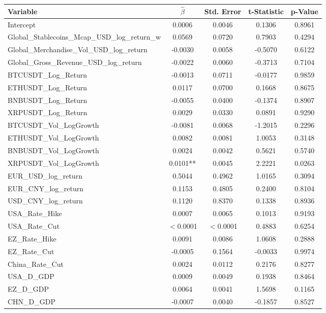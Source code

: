 \begin{tabular}{lcccc}
  \toprule
  \textbf{Variable} & \textbf{$\hat{\beta}$} & \textbf{Std. Error} & \textbf{t-Statistic} & \textbf{p-Value} \\ 
  \midrule
  Intercept & 0.0006 & 0.0046 & 0.1306 & 0.8961 \\ 
  Global\_Stablecoins\_Mcap\_USD\_log\_return\_w & 0.0569 & 0.0720 & 0.7903 & 0.4294 \\ 
  Global\_Merchandise\_Vol\_USD\_log\_return & -0.0030 & 0.0058 & -0.5070 & 0.6122 \\ 
  Global\_Gross\_Revenue\_USD\_log\_return & -0.0022 & 0.0060 & -0.3713 & 0.7104 \\ 
  BTCUSDT\_Log\_Return & -0.0013 & 0.0711 & -0.0177 & 0.9859 \\ 
  ETHUSDT\_Log\_Return & 0.0117 & 0.0700 & 0.1668 & 0.8675 \\ 
  BNBUSDT\_Log\_Return & -0.0055 & 0.0400 & -0.1374 & 0.8907 \\ 
  XRPUSDT\_Log\_Return & 0.0029 & 0.0330 & 0.0891 & 0.9290 \\ 
  BTCUSDT\_Vol\_LogGrowth & -0.0081 & 0.0068 & -1.2015 & 0.2296 \\ 
  ETHUSDT\_Vol\_LogGrowth & 0.0082 & 0.0081 & 1.0053 & 0.3148 \\ 
  BNBUSDT\_Vol\_LogGrowth & 0.0024 & 0.0042 & 0.5621 & 0.5740 \\ 
  XRPUSDT\_Vol\_LogGrowth & 0.0101** & 0.0045 & 2.2221 & 0.0263 \\ 
  EUR\_USD\_log\_return & 0.5044 & 0.4962 & 1.0165 & 0.3094 \\ 
  EUR\_CNY\_log\_return & 0.1153 & 0.4805 & 0.2400 & 0.8104 \\ 
  USD\_CNY\_log\_return & 0.1120 & 0.8370 & 0.1338 & 0.8936 \\ 
  USA\_Rate\_Hike & 0.0007 & 0.0065 & 0.1013 & 0.9193 \\ 
  USA\_Rate\_Cut & $<$0.0001 & $<$0.0001 & 0.4883 & 0.6254 \\ 
  EZ\_Rate\_Hike & 0.0091 & 0.0086 & 1.0608 & 0.2888 \\ 
  EZ\_Rate\_Cut & -0.0005 & 0.1564 & -0.0033 & 0.9974 \\ 
  China\_Rate\_Cut & 0.0024 & 0.0112 & 0.2176 & 0.8277 \\ 
  USA\_D\_GDP & 0.0009 & 0.0049 & 0.1938 & 0.8464 \\ 
  EZ\_D\_GDP & 0.0064 & 0.0041 & 1.5698 & 0.1165 \\ 
  CHN\_D\_GDP & -0.0007 & 0.0040 & -0.1857 & 0.8527 \\ 

\end{tabular}
